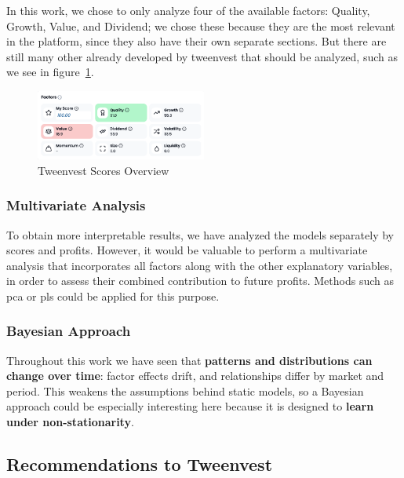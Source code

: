 \documentclass[11pt,english,a4paper,hidelinks]{book}
\begin{document}
\noindent In this work, we chose to only analyze four of the available factors: Quality, Growth, Value, and Dividend; we chose these because they are the most relevant in the platform, since they also have their own separate sections. But there are still many other already developed by tweenvest that should be analyzed, such as we see in figure~\ref{fig:factor_scores_overview}.

\begin{figure}[H]
    \centering
    \includegraphics[width=0.5\textwidth]{images/tweenvest/All of the scores.png}
    \caption{Tweenvest Scores Overview}
    \label{fig:factor_scores_overview}
\end{figure}

\subsubsection{Multivariate Analysis}

\noindent To obtain more interpretable results, we have analyzed the models separately by scores and profits. However, it would be valuable to perform a multivariate analysis that incorporates all factors along with the other explanatory variables, in order to assess their combined contribution to future profits. Methods such as \gls{pca} or \gls{pls} could be applied for this purpose.

\subsubsection{Bayesian Approach}

\noindent Throughout this work we have seen that \textbf{patterns and distributions can change over time}: factor effects drift, and relationships differ by market and period. This weakens the assumptions behind static models, so a Bayesian approach could be especially interesting here because it is designed to \textbf{learn under non-stationarity}.

\subsection{Recommendations to Tweenvest}
\end{document}
